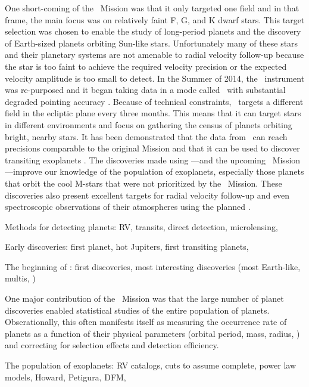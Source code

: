 One short-coming of the \kepler\ Mission was that it only targeted one field
and in that frame, the main focus was on relatively faint F, G, and K dwarf
stars.
This target selection was chosen to enable the study of long-period planets
and the discovery of Earth-sized planets orbiting Sun-like stars.
Unfortunately many of these stars and their planetary systems are not amenable
to radial velocity follow-up because the star is too faint to achieve the
required velocity precision or the expected velocity amplitude is too small to
detect.
In the Summer of 2014, the \kepler\ instrument was re-purposed and it began
taking data in a mode called \KT\ with substantial degraded pointing accuracy
\citep{Howell:2014}.
Because of technical constraints, \KT\ targets a different field in the
ecliptic plane every three months.
This means that it can target stars in different environments and focus on
gathering the census of planets orbiting bright, nearby stars.
It has been demonstrated that the data from \KT\ can reach precisions
comparable to the original Mission and that it can be used to discover
transiting exoplanets \citep[][and  of this
dissertation]{Vanderburg:2014, Vanderburg:2015, Crossfield:2015,
Foreman-Mackey:2015}.
The discoveries made using \KT---and the upcoming \tess\ Mission---improve our
knowledge of the population of exoplanets, especially those planets that orbit
the cool M-stars that were not prioritized by the \kepler\ Mission.
These discoveries also present excellent targets for radial velocity follow-up
and even spectroscopic observations of their atmospheres using the planned
.


{Methods for detecting planets: RV, transits, direct detection,
microlensing, \etc}

{Early discoveries: first planet, hot Jupiters, first transiting
planets, \etc}

{The beginning of \kepler: first discoveries, most interesting
discoveries (most Earth-like, multis, \etc)}

One major contribution of the \kepler\ Mission was that the large number of
planet discoveries enabled statistical studies of the entire population of
planets.
Obserationally, this often manifests itself as measuring the occurrence rate
of planets as a function of their physical parameters (orbital period, mass,
radius, \etc) and correcting for selection effects and detection efficiency.

{The population of exoplanets: RV catalogs, cuts to assume complete,
power law models, Howard, Petigura, DFM, \etc}

